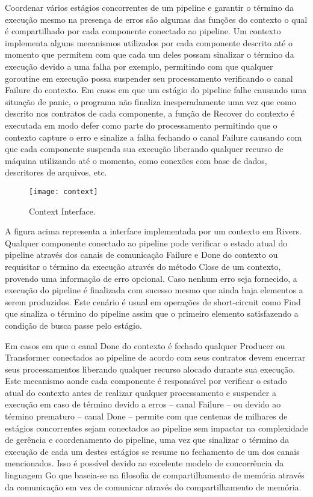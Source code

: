 Coordenar vários estágios concorrentes de um pipeline e garantir o término da execução mesmo na presença de erros são algumas das funções do contexto o qual é compartilhado por cada componente conectado ao pipeline. Um contexto implementa alguns mecanismos utilizados por cada componente descrito até o momento que permitem com que cada um deles possam sinalizar o término da execução devido a uma falha por exemplo, permitindo com que qualquer goroutine em execução possa suspender seu processamento verificando o canal Failure do contexto. Em casos em que um estágio do pipeline falhe causando uma situação de panic, o programa não finaliza inesperadamente uma vez que como descrito nos contratos de cada componente, a função de Recover do contexto é executada em modo defer como parte do processamento permitindo que o contexto capture o erro e sinalize a falha fechando o canal Failure causando com que cada componente suspenda sua execução liberando qualquer recurso de máquina utilizando até o momento, como conexões com base de dados, descritores de arquivos, etc.

\begin{figure}[H]
  \texttt{[image: context]}
  \centering
  \caption{Context Interface.}
  \label{code:rivers:context}
\end{figure}

A figura acima representa a interface implementada por um contexto em Rivers. Qualquer componente conectado ao pipeline pode verificar o estado atual do pipeline através dos canais de comunicação Failure e Done do contexto ou requisitar o término da execução através do método Close de um contexto, provendo uma informação de erro opcional. Caso nenhum erro seja fornecido, a execução do pipeline é finalizada com sucesso mesmo que ainda haja elementos a serem produzidos. Este cenário é usual em operações de short-circuit como Find que sinaliza o término do pipeline assim que o primeiro elemento satisfazendo a condição de busca passe pelo estágio.

Em casos em que o canal Done do contexto é fechado qualquer Producer ou Transformer conectados ao pipeline de acordo com seus contratos devem encerrar seus processamentos liberando qualquer recurso alocado durante sua execução. Este mecanismo aonde cada componente é responsável por verificar o estado atual do contexto antes de realizar qualquer processamento e suspender a execução em caso de término devido a erros -- canal Failure -- ou devido ao término prematuro -- canal Done -- permite com que centenas de milhares de estágios concorrentes sejam conectados ao pipeline sem impactar na complexidade de gerência e coordenamento do pipeline, uma vez que sinalizar o término da execução de cada um destes estágios se resume no fechamento de um dos canais mencionados. Isso é possível devido ao excelente modelo de concorrência da linguagem Go que baseia-se na filosofia de compartilhamento de memória através da comunicação em vez de comunicar através do compartilhamento de memória.

